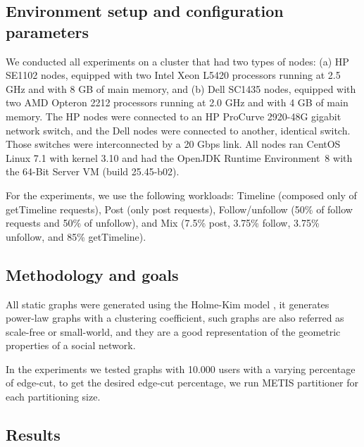 \subsection{Environment setup and configuration parameters}
\label{sec:evaluation:setup}

We conducted all experiments on a cluster that had two types of nodes: (a) HP SE1102 nodes, equipped with two Intel Xeon L5420 processors running at 2.5 GHz and with 8 GB of main memory, and (b) Dell SC1435 nodes, equipped with two AMD Opteron 2212 processors running at 2.0 GHz and with 4 GB of main memory. The HP nodes were connected to an HP ProCurve 2920-48G gigabit network switch, and the Dell nodes were connected to another, identical switch. Those switches were interconnected by a 20 Gbps link.
All nodes ran CentOS Linux 7.1 with kernel 3.10 and had the OpenJDK Runtime Environment~8 with the \mbox{64-Bit} Server VM (build 25.45-b02).

For the experiments, we use the following workloads:
Timeline (composed only of getTimeline requests),
Post (only post requests),
Follow/unfollow (50\% of follow requests and 50\% of unfollow), and
Mix (7.5\% post, 3.75\% follow, 3.75\% unfollow, and 85\% getTimeline).

\subsection{Methodology and goals}
All static graphs were generated using the Holme-Kim model \cite{holme-kim}, it generates power-law graphs
with a clustering coefficient, such graphs are also referred as scale-free or small-world, and they are a good representation
of the geometric properties of a social network.

In the experiments we tested graphs with 10.000 users with a varying percentage of edge-cut, to get the desired edge-cut
percentage, we run METIS partitioner for each partitioning size. 

\subsection{Results}




\label{sec:evaluation:strongloc}

